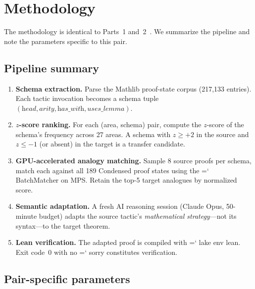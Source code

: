 \documentclass[11pt]{article}
\renewcommand{\texttt}[1]{%
  \begingroup\ttfamily\hyphenchar\font=`\-\relax
  \def\_{\textunderscore\discretionary{}{}{}}%
  #1\endgroup}
\theoremstyle{definition}
\theoremstyle{remark}
\begin{document}
\section{Methodology}\label{sec:method}

The methodology is identical to Parts~1 and~2~\cite{yanasse_part1,
yanasse_part2}.  We summarize the pipeline and note the parameters
specific to this pair.

\subsection{Pipeline summary}

\begin{enumerate}
\item \textbf{Schema extraction.}  Parse the Mathlib proof-state
  corpus (217{,}133 entries).  Each tactic invocation becomes a schema
  tuple $(\textit{head}, \textit{arity}, \textit{has\_with},
  \textit{uses\_lemma})$.

\item \textbf{$z$-score ranking.}  For each (area, schema) pair,
  compute the $z$-score of the schema's frequency across 27 areas.
  A schema with $z \geq +2$ in the source and $z \leq -1$ (or absent)
  in the target is a transfer candidate.

\item \textbf{GPU-accelerated analogy matching.}  Sample 8 source
  proofs per schema, match each against all 189 Condensed proof
  states using the \texttt{BatchMatcher} on MPS.  Retain the top-5
  target analogues by normalized score.

\item \textbf{Semantic adaptation.}  A fresh AI reasoning session
  (Claude Opus, 50-minute budget) adapts the source tactic's
  \emph{mathematical strategy}---not its syntax---to the target
  theorem.

\item \textbf{Lean verification.}  The adapted proof is compiled
  with \texttt{lake env lean}.  Exit code~0 with no \texttt{sorry}
  constitutes verification.
\end{enumerate}

\subsection{Pair-specific parameters}
\end{document}
